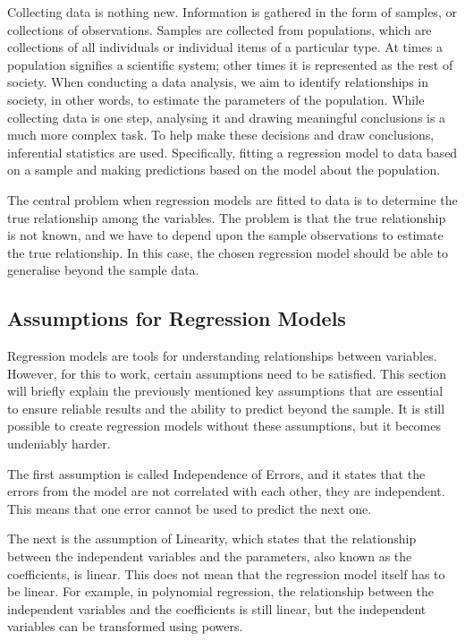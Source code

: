 Collecting data is nothing new. Information is gathered in the form of samples, or collections of observations. Samples are collected from populations, which are collections of all individuals or individual items of a particular type. At times a population signifies a scientific system; other times it is represented as the rest of society. When conducting a data analysis, we aim to identify relationships in society, in other words, to estimate the parameters of the population. While collecting data is one step, analysing it and drawing meaningful conclusions is a much more complex task. To help make these decisions and draw conclusions, inferential statistics are used. \cite{ProbAndStat} Specifically, fitting a regression model to data based on a sample and making predictions based on the model about the population. \newline

\noindent The central problem when regression models are fitted to data is to determine the true relationship among the variables. The problem is that the true relationship is not known, and we have to depend upon the sample observations to estimate the true relationship. In this case, the chosen regression model should be able to generalise beyond the sample data. \newline 



\subsection{Assumptions for Regression Models}

\noindent Regression models are tools for understanding relationships between variables. However, for this to work, certain assumptions need to be satisfied. This section will briefly explain the previously mentioned key assumptions that are essential to ensure reliable results and the ability to predict beyond the sample. It is still possible to create regression models without these assumptions, but it becomes undeniably harder.  \newline

\noindent The first assumption is called Independence of Errors, and it states that the errors from the model are not correlated with each other, they are independent. This means that one error cannot be used to predict the next one. \newline


\noindent The next is the assumption of Linearity, which states that the relationship between the independent variables and the parameters, also known as the coefficients, is linear. This does not mean that the regression model itself has to be linear. For example, in polynomial regression, the relationship between the independent variables and the coefficients is still linear, but the independent variables can be transformed using powers.\newline



